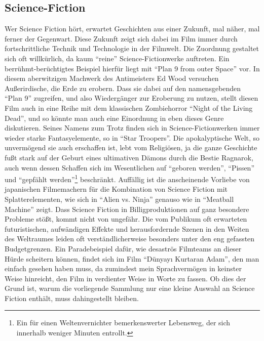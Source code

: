 \subsection{Science-Fiction}

Wer Science Fiction hört, erwartet Geschichten aus einer Zukunft, mal näher, mal ferner der Gegenwart.
Diese Zukunft zeigt sich dabei im Film immer durch fortschrittliche Technik und Technologie in der Filmwelt.
Die Zuordnung gestaltet sich oft willkürlich, da kaum ``reine'' Science-Fictionwerke auftreten.
Ein berrühmt-berüchtigtes Beispiel hierfür liegt mit ``Plan 9 from outer Space'' vor.
In diesem aberwitzigen Machwerk des Antimeisters Ed Wood versuchen Außerirdische, die Erde zu erobern.
Dass sie dabei auf den namensgebenden ``Plan 9'' zugreifen, und also Wiedergänger zur Eroberung zu nutzen, stellt diesen Film auch in eine Reihe mit dem klassischen Zombiehorror ``Night of the Living Dead'', und so könnte man auch eine Einordnung in eben dieses Genre diskutieren.
Seines Namens zum Trotz finden sich in Science-Fictionwerken immer wieder starke Fantasyelemente, so in ``Star Troopers''.
Die apokalyptische Welt, so unvermögend sie auch erschaffen ist, lebt vom Religiösen, ja die ganze Geschichte fußt stark auf der Geburt eines ultimativen Dämons durch die Bestie Ragnarok, auch wenn dessen Schaffen sich im Wesentlichen auf ``geboren werden'', ``Pissen'' und ``gepfählt werden''\footnote{Ein für einen Weltenvernichter bemerkenswerter Lebensweg, der sich innerhalb weniger Minuten entrollt.} beschränkt.
Auffällig ist die anscheinende Vorliebe von japanischen Filmemachern für die Kombination von Science Fiction mit Splatterelementen, wie sich in ``Alien vs. Ninja'' genauso wie in ``Meatball Machine'' zeigt.
Dass Science Fiction in Billigproduktionen auf ganz besondere Probleme stößt, kommt nicht von ungefähr.
Die vom Publikum oft erwarteten futuristischen, aufwändigen Effekte und herausfordernde Szenen in den Weiten des Weltraumes leiden oft verständlicherweise besonders unter den eng gefassten Budgetgrenzen.
Ein Paradebeispiel dafür, wie desaströs Filmteams an dieser Hürde scheitern können, findet sich im Film ``Dünyayı Kurtaran Adam'', den man einfach gesehen haben muss, da zumindest mein Sprachvermögen in keinster Weise hinreicht, den Film in verdienter Weise in Worte zu fassen.
Ob dies der Grund ist, warum die vorliegende Sammlung nur eine kleine Auswahl an Science Fiction enthält, muss dahingestellt bleiben.
